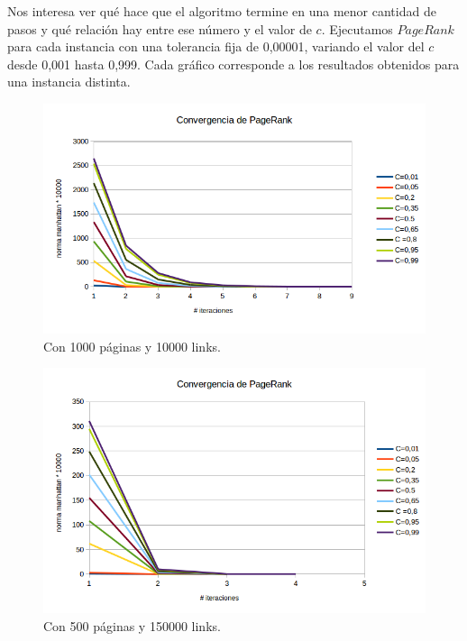 Nos interesa ver qué hace que el algoritmo termine en una menor cantidad de pasos y qué relación hay entre ese número y el valor de $c$. Ejecutamos $PageRank$ para cada instancia con una tolerancia fija de 0,00001, variando el valor del $c$ desde 0,001 hasta 0,999. Cada gráfico corresponde a los resultados obtenidos para una instancia distinta.\\



\begin{figure}[h]
  \includegraphics[scale= 0.6]{imagenes/convergencia2.png}
   \caption{Con  1000 páginas y  10000 links.}
  \label{fig:img1}
\end{figure}


\newpage

\begin{figure}
  \vspace{-20pt}
  \begin{center}
    \includegraphics[scale= 0.6]{imagenes/convergencia3.png}
  \end{center}
  \vspace{-20pt}
   \caption{Con  500 páginas y  150000 links.}
  \vspace{-10pt}
  \label{fig:img1}
\end{figure}

